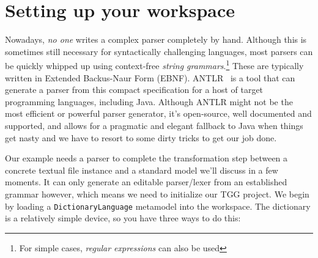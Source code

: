 \newpage
\section{Setting up your workspace}
\genHeader

Nowadays, \emph{no one} writes a complex parser completely by hand. Although this is sometimes still necessary for syntactically challenging languages, most
parsers can be quickly whipped up using context-free \emph{string grammars}.\footnote{For simple cases, \emph{regular expressions} can also be used} These are
typically written in Extended Backus-Naur Form (EBNF). ANTLR~\cite{ANTLR} is a tool that can generate a parser from this compact specification for
a host of target programming languages, including Java. Although ANTLR might not be the most efficient or powerful parser generator, it's open-source, well
documented and supported, and allows for a pragmatic and elegant fallback to Java when things get nasty and we have to resort to some dirty tricks to get our job done. 

Our example needs a parser to complete the transformation step between a concrete textual file instance and a standard model we'll discuss in a few moments.
It can only generate an editable parser/lexer from an established grammar however, which means we need to initialize our TGG project. We begin by loading a
\texttt{DictionaryLanguage} metamodel into the workspace. The dictionary is a relatively simple device, so you have three ways to do this:


